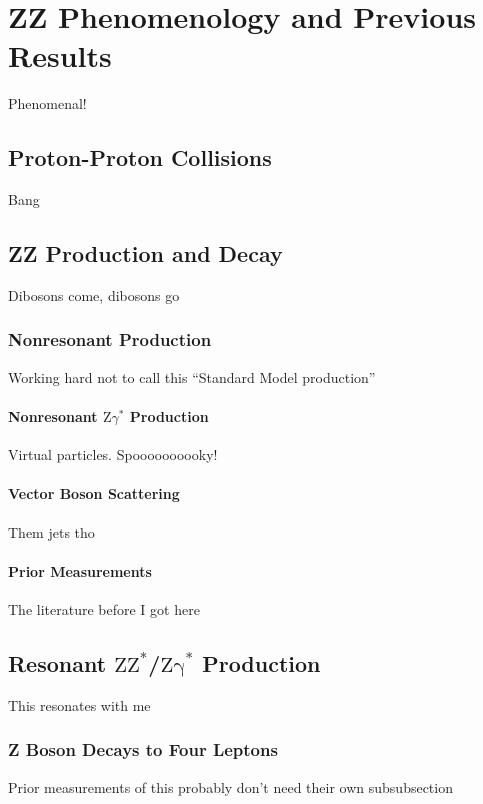 \chapter{ZZ Phenomenology and Previous Results}
Phenomenal!

\section{Proton-Proton Collisions}\label{sec:pp}
Bang



\section{ZZ Production and Decay}
Dibosons come, dibosons go

\subsection{Nonresonant Production}
Working hard not to call this ``Standard Model production''

\subsubsection{Nonresonant
               \texorpdfstring{$\mathrm{Z}\gamma^\ast$}{Zgamma*}
               Production}
Virtual particles. Spoooooooooky!

\subsubsection{Vector Boson Scattering}
Them jets tho

\subsubsection{Prior Measurements}
The literature before I got here


\section{Resonant
         \texorpdfstring{$\mathrm{ZZ}^\ast$/$\mathrm{Z\gamma}^\ast$}
         {ZZ*/Zgamma*}
         Production
         }
This resonates with me

\subsection{Z Boson Decays to Four Leptons}
Prior measurements of this probably don't need their own subsubsection


